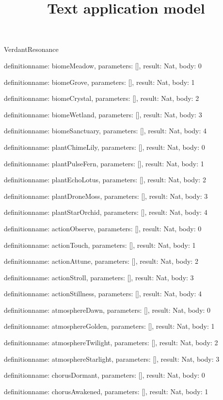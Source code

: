 \begin{lexlean}{VerdantResonance}
\title{Text application model}
\begin{semanticmodule}
definition{name: biomeMeadow, parameters: [], result: Nat, body: 0}

definition{name: biomeGrove, parameters: [], result: Nat, body: 1}

definition{name: biomeCrystal, parameters: [], result: Nat, body: 2}

definition{name: biomeWetland, parameters: [], result: Nat, body: 3}

definition{name: biomeSanctuary, parameters: [], result: Nat, body: 4}

definition{name: plantChimeLily, parameters: [], result: Nat, body: 0}

definition{name: plantPulseFern, parameters: [], result: Nat, body: 1}

definition{name: plantEchoLotus, parameters: [], result: Nat, body: 2}

definition{name: plantDroneMoss, parameters: [], result: Nat, body: 3}

definition{name: plantStarOrchid, parameters: [], result: Nat, body: 4}

definition{name: actionObserve, parameters: [], result: Nat, body: 0}

definition{name: actionTouch, parameters: [], result: Nat, body: 1}

definition{name: actionAttune, parameters: [], result: Nat, body: 2}

definition{name: actionStroll, parameters: [], result: Nat, body: 3}

definition{name: actionStillness, parameters: [], result: Nat, body: 4}

definition{name: atmosphereDawn, parameters: [], result: Nat, body: 0}

definition{name: atmosphereGolden, parameters: [], result: Nat, body: 1}

definition{name: atmosphereTwilight, parameters: [], result: Nat, body: 2}

definition{name: atmosphereStarlight, parameters: [], result: Nat, body: 3}

definition{name: chorusDormant, parameters: [], result: Nat, body: 0}

definition{name: chorusAwakened, parameters: [], result: Nat, body: 1}


\end{semanticmodule}
\end{lexlean}
